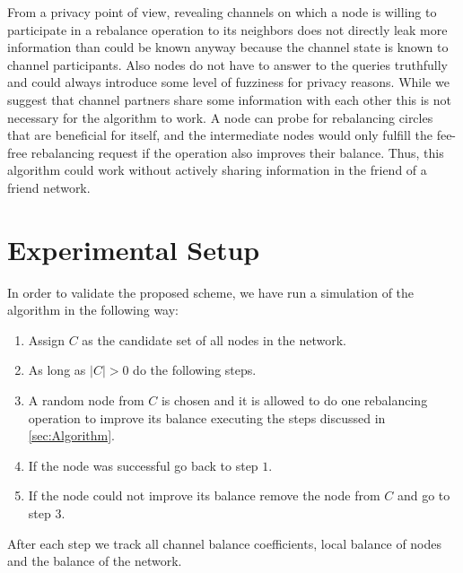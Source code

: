 \documentclass[a4paper]{paper}
\begin{document}
From a privacy point of view, revealing channels on which a node is willing to participate in a rebalance operation to its neighbors does not directly leak more information than could be known anyway because the channel state is known to channel participants.
Also nodes do not have to answer to the queries truthfully and could always introduce some level of fuzziness for privacy reasons. 
While we suggest that channel partners share some information with each other this is not necessary for the algorithm to work.
A node can probe for rebalancing circles that are beneficial for itself, 
and the intermediate nodes would only fulfill the fee-free rebalancing request if the operation also improves their balance. 
Thus, this algorithm could work without actively sharing information in the friend of a friend network.



\section{Experimental Setup}
\label{sec:setup}

In order to validate the proposed scheme, we have run a simulation of the algorithm in the following way:
\begin{enumerate}
\item Assign $C$ as the candidate set of all nodes in the network.
\item As long as $|C| > 0$ do the following steps.
\item A random node from $C$ is chosen and it is allowed to do one rebalancing operation to improve its balance executing the steps discussed in \cref{sec:Algorithm}.
\item If the node was successful go back to step $1$.
\item If the node could not improve its balance remove the node from $C$ and go to step $3$.
\end{enumerate}

After each step we track all channel balance coefficients, local balance of nodes and the balance of the network.
\end{document}
